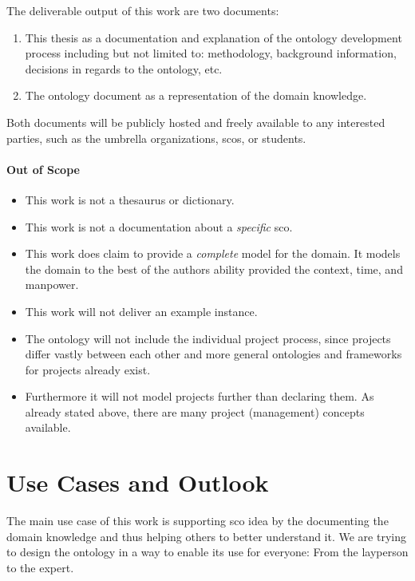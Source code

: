 \documentclass[a4paper, DIV=13, BCOR=0cm]{scrbook}
\begin{document}
The deliverable output of this work are two documents:
\begin{enumerate}
	\item This thesis as a documentation and explanation of the ontology development process including but not limited to: methodology, background information, decisions in regards to the ontology, etc.
	\item The ontology document as a representation of the domain knowledge.
\end{enumerate}

Both documents will be publicly hosted and freely available to any interested parties, such as the umbrella organizations, \glspl{sco}, or students.

\paragraph{Out of Scope}
\begin{itemize}
	\item This work is not a thesaurus or dictionary.
	\item This work is not a documentation about a \textit{specific} \gls{sco}.
	\item This work does claim to provide a \textit{complete} model for the domain. It models the domain to the best of the authors ability provided the context, time, and manpower.
	\item This work will not deliver an example instance.
	\item The ontology will not include the individual project process, since projects differ vastly between each other and more general ontologies and frameworks for projects already exist.
	\item Furthermore it will not model projects further than declaring them. As already stated above, there are many project (management) concepts available.
\end{itemize}

\section{Use Cases and Outlook }
The main use case of this work is supporting \gls{sco} idea by the documenting the domain knowledge and thus helping others to better understand it. We are trying to design the ontology in a way to enable its use for everyone: From the layperson to the expert.
\end{document}
